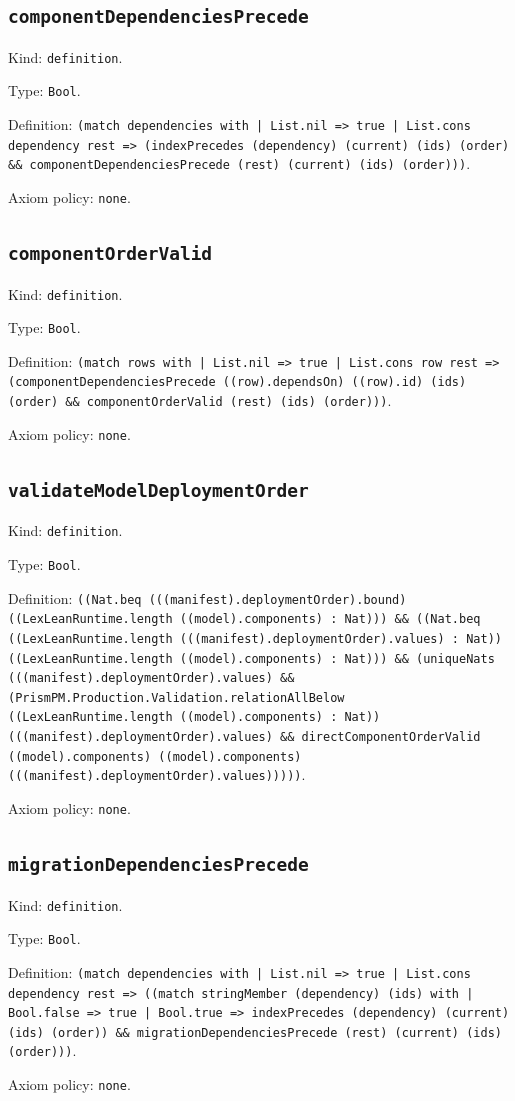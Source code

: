 \documentclass[11pt]{article}
\begin{document}
\subsection*{\texttt{componentDependenciesPrecede}}
\noindent Kind: \texttt{definition}.\par
\noindent Type: \texttt{Bool}.\par
\noindent Definition: \texttt{(match dependencies with | List.nil => true | List.cons dependency rest => (indexPrecedes (dependency) (current) (ids) (order) \&\& componentDependenciesPrecede (rest) (current) (ids) (order)))}.\par
\noindent Axiom policy: \texttt{none}.\par
\subsection*{\texttt{componentOrderValid}}
\noindent Kind: \texttt{definition}.\par
\noindent Type: \texttt{Bool}.\par
\noindent Definition: \texttt{(match rows with | List.nil => true | List.cons row rest => (componentDependenciesPrecede ((row).dependsOn) ((row).id) (ids) (order) \&\& componentOrderValid (rest) (ids) (order)))}.\par
\noindent Axiom policy: \texttt{none}.\par
\subsection*{\texttt{validateModelDeploymentOrder}}
\noindent Kind: \texttt{definition}.\par
\noindent Type: \texttt{Bool}.\par
\noindent Definition: \texttt{((Nat.beq (((manifest).deploymentOrder).bound) ((LexLeanRuntime.length ((model).components) : Nat))) \&\& ((Nat.beq ((LexLeanRuntime.length (((manifest).deploymentOrder).values) : Nat)) ((LexLeanRuntime.length ((model).components) : Nat))) \&\& (uniqueNats (((manifest).deploymentOrder).values) \&\& (PrismPM.Production.Validation.relationAllBelow ((LexLeanRuntime.length ((model).components) : Nat)) (((manifest).deploymentOrder).values) \&\& directComponentOrderValid ((model).components) ((model).components) (((manifest).deploymentOrder).values)))))}.\par
\noindent Axiom policy: \texttt{none}.\par
\subsection*{\texttt{migrationDependenciesPrecede}}
\noindent Kind: \texttt{definition}.\par
\noindent Type: \texttt{Bool}.\par
\noindent Definition: \texttt{(match dependencies with | List.nil => true | List.cons dependency rest => ((match stringMember (dependency) (ids) with | Bool.false => true | Bool.true => indexPrecedes (dependency) (current) (ids) (order)) \&\& migrationDependenciesPrecede (rest) (current) (ids) (order)))}.\par
\noindent Axiom policy: \texttt{none}.\par
\end{document}
